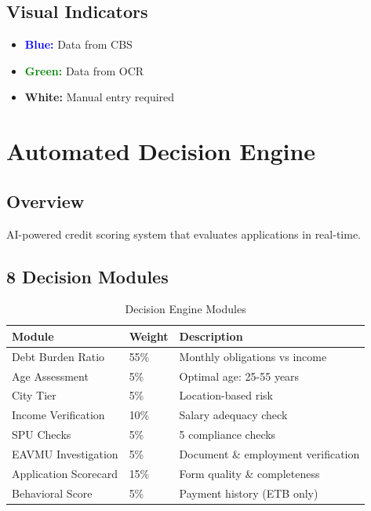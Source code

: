 \documentclass[11pt,a4paper]{article}
\begin{document}
\subsection{Visual Indicators}
\begin{itemize}[leftmargin=*]
    \item \textcolor{blue}{\textbf{Blue:}} Data from CBS
    \item \textcolor{green}{\textbf{Green:}} Data from OCR
    \item \textbf{White:} Manual entry required
\end{itemize}

\section{Automated Decision Engine}

\subsection{Overview}
AI-powered credit scoring system that evaluates applications in real-time.

\subsection{8 Decision Modules}

\begin{table}[h]
\centering
\small
\begin{tabular}{@{}p{4.5cm}p{1.5cm}p{6cm}@{}}
\toprule
\textbf{Module} & \textbf{Weight} & \textbf{Description} \\ \midrule
Debt Burden Ratio & 55\% & Monthly obligations vs income \\
Age Assessment & 5\% & Optimal age: 25-55 years \\
City Tier & 5\% & Location-based risk \\
Income Verification & 10\% & Salary adequacy check \\
SPU Checks & 5\% & 5 compliance checks \\
EAVMU Investigation & 5\% & Document \& employment verification \\
Application Scorecard & 15\% & Form quality \& completeness \\
Behavioral Score & 5\% & Payment history (ETB only) \\ \bottomrule
\end{tabular}
\caption{Decision Engine Modules}
\end{table}
\end{document}
